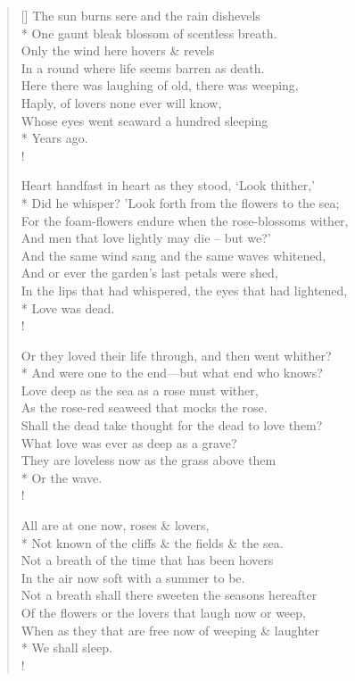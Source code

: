 \documentclass[MAIN]{subfiles}
\begin{document}
\begin{verse}[\versewidth]
The sun burns sere and the rain dishevels\\*
\vin One gaunt bleak blossom of scentless breath.\\ 
Only the wind here hovers \& revels\\
\vin In a round where life seems barren as death.\\
Here there was laughing of old, there was weeping,\\
\vin Haply, of lovers none ever will know,\\
Whose eyes went seaward a hundred sleeping\\*
\vin \vin \vin Years ago.\\!

Heart handfast in heart as they stood, `Look thither,'\\*
\vin Did he whisper? 'Look forth from the flowers to the sea;\\ 
For the foam-flowers endure when the rose-blossoms wither,\\ 
\vin And men that love lightly may die -- but we?'\\
And the same wind sang and the same waves whitened,\\
\vin And or ever the garden's last petals were shed,\\
In the lips that had whispered, the eyes that had lightened,\\*
\vin \vin \vin Love was dead.\\!

Or they loved their life through, and then went whither?\\*
\vin And were one to the end—but what end who knows?\\
Love deep as the sea as a rose must wither,\\
\vin As the rose-red seaweed that mocks the rose.\\
Shall the dead take thought for the dead to love them?\\
\vin What love was ever as deep as a grave?\\
They are loveless now as the grass above them\\*
\vin \vin \vin Or the wave.\\!

All are at one now, roses \& lovers,\\*
\vin Not known of the cliffs \& the fields \& the sea.\\
Not a breath of the time that has been hovers\\
\vin In the air now soft with a summer to be.\\
Not a breath shall there sweeten the seasons hereafter\\
\vin Of the flowers or the lovers that laugh now or weep,\\
When as they that are free now of weeping \& laughter\\*
\vin \vin \vin We shall sleep.\\!


\end{verse}
\end{document}
